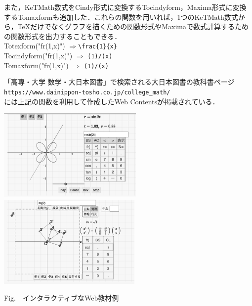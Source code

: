 \documentclass[a4j,12pt]{ujarticle}
\begin{document}
また，KeTMath数式をCindy形式に変換するTocindyform，Maxima形式に変換するTomaxformも追加した．これらの関数を用いれば，1つのKeTMath数式から，\TeX だけでなくグラフを描くための関数形式やMaximaで数式計算するための関数形式を出力することもできる．\\
\hspace*{4zw}Totexform("fr(1,x)") $\Longrightarrow$\verb|\frac{1}{x}|\\
\hspace*{4zw}Tocindyform("fr(1,x)")  $\Longrightarrow$ \verb|(1)/(x)|\\
\hspace*{4zw}Tomaxform("fr(1,x)")  $\Longrightarrow$ \verb|(1)/(x)|

\vspace{1mm}

\noindent
「高専・大学 数学・大日本図書」で検索される大日本図書の教科書ページ\\%
\hspace*{2zw}\verb|https://www.dainippon-tosho.co.jp/college_math/|\\
には上記の関数を利用して作成したWeb Contentsが掲載されている．


\begin{center}
\includegraphics[bb=0.00 0.00 906.00 577.00,height=45mm]{fig/dntcalbw.pdf}
%
\hspace{5mm}%
\includegraphics[bb=0.00 0.00 898.00 578.00,height=45mm]{fig/dntlinbw.pdf}

\addtocounter{figure}{1}Fig.\thefigure\ \ インタラクティブなWeb教材例\vspace{-1mm}

\end{center}
\end{document}

